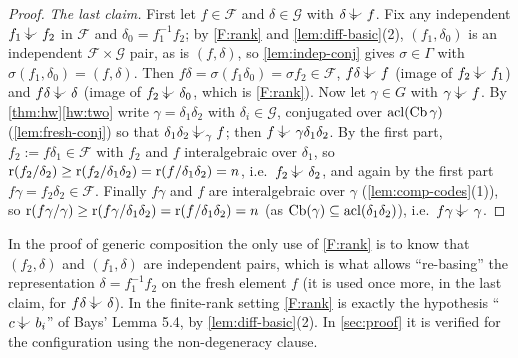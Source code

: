\begin{proof}
\emph{The last claim.}  First let $f\in\mathcal F$ and $\delta\in\mathcal G$ with
$\delta\ind{}f$.  Fix any independent $f_1\ind{}f_2$ in $\mathcal F$ and $\delta_0=f_1^{-1}f_2$;
by \ref{F:rank} and \cref{lem:diff-basic}(2), $(f_1,\delta_0)$ is an independent
$\mathcal F\times\mathcal G$ pair, as is $(f,\delta)$, so \cref{lem:indep-conj} gives
$\sigma\in\Gamma$ with $\sigma(f_1,\delta_0)=(f,\delta)$.  Then $f\delta=\sigma(f_1\delta_0)=\sigma f_2\in\mathcal F$,
$f\delta\ind{}f$ (image of $f_2\ind{}f_1$) and $f\delta\ind{}\delta$ (image of
$f_2\ind{}\delta_0$, which is \ref{F:rank}).  Now let $\gamma\in G$ with $\gamma\ind{}f$.  By
\cref{thm:hw}\ref{hw:two} write $\gamma=\delta_1\delta_2$ with $\delta_i\in\mathcal G$,
conjugated over $\operatorname{acl}(\operatorname{Cb}\gamma)$ (\cref{lem:fresh-conj}) so that
$\delta_1\delta_2\ind{\gamma}f$; then
$f\ind{}\gamma\delta_1\delta_2$.  By the first part, $f_2:=f\delta_1\in\mathcal F$ with
$f_2$ and $f$ interalgebraic over $\delta_1$, so
$\operatorname{r}(f_2/\delta_2)\ge\operatorname{r}(f_2/\delta_1\delta_2)=\operatorname{r}(f/\delta_1\delta_2)=n$, i.e.\ $f_2\ind{}\delta_2$,
and again by the first part $f\gamma=f_2\delta_2\in\mathcal F$.  Finally $f\gamma$ and $f$
are interalgebraic over $\gamma$ (\cref{lem:comp-codes}(1)), so
$\operatorname{r}(f\gamma/\gamma)\ge\operatorname{r}(f\gamma/\delta_1\delta_2)=\operatorname{r}(f/\delta_1\delta_2)=n$ (as
$\operatorname{Cb}(\gamma)\subseteq\operatorname{acl}(\delta_1\delta_2)$), i.e.\ $f\gamma\ind{}\gamma$.
\end{proof}

\begin{remark}
In the proof of generic composition the only use of \ref{F:rank} is to know that
$(f_2,\delta)$ and $(f_1,\delta)$ are independent pairs, which is what allows
``re-basing'' the representation $\delta=f_1^{-1}f_2$ on the fresh element $f$
(it is used once more, in the last claim, for $f\delta\ind{}\delta$).  In the
finite-rank setting \ref{F:rank} is exactly the hypothesis ``$c\ind{}b_i$'' of Bays'
Lemma 5.4, by \cref{lem:diff-basic}(2).  In \cref{sec:proof} it is verified for the
configuration using the non-degeneracy clause.
\end{remark}
